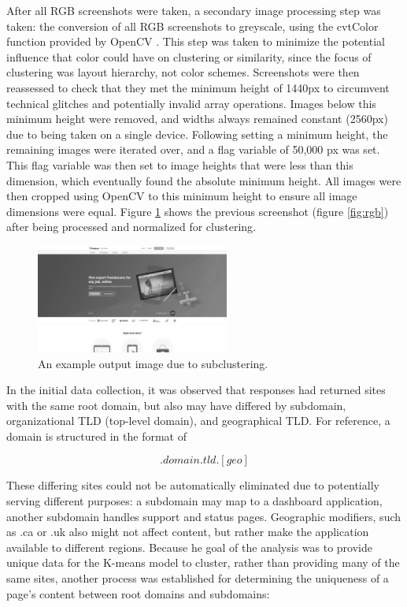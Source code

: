 \documentclass[conference]{IEEEtran}
\begin{document}
After all RGB screenshots were taken, a secondary image processing step was taken: the conversion of all RGB screenshots to greyscale, using the cvtColor function provided by OpenCV \cite{cv2color}. This step was taken to minimize the potential influence that color could have on clustering or similarity, since the focus of clustering was layout hierarchy, not color schemes. 
Screenshots were then reassessed to check that they met the minimum height of 1440px to circumvent technical glitches and potentially invalid array operations. Images below this minimum height were removed, and widths always remained constant (2560px) due to being taken on a single device. Following setting a minimum height, the remaining images were iterated over, and a flag variable of 50,000 px was set. This flag variable was then set to image heights that were less than this dimension, which eventually found the absolute minimum height. All images were then cropped using OpenCV to this minimum height to ensure all image dimensions were equal. Figure \ref{fig:greyscale} shows the previous screenshot (figure \ref{fig:rgb}) after being processed and normalized for clustering.


\begin{figure}[!t]
\centering
\label{fig:greyscale}
\includegraphics[width=2.5in]{media/freelancer_com_processed.png}
\caption{An example output image due to subclustering.}
\end{figure}

In the initial data collection, it was observed that responses had returned sites with the same root domain, but also may have differed by subdomain, organizational TLD (top-level domain), and geographical TLD. For reference, a domain is structured in the format of

\begin{equation}
    [subdomain].domain.tld.[geo]
\end{equation}


These differing sites could not be automatically eliminated due to potentially serving different purposes: a subdomain may map to a dashboard application, another subdomain handles support and status pages. Geographic modifiers, such as .ca or .uk also might not affect content, but rather make the application available to different regions. Because he goal of the analysis was to provide unique data for the K-means model to cluster, rather than providing many of the same sites, another process was established for determining the uniqueness of a page's content between root domains and subdomains:
\end{document}
